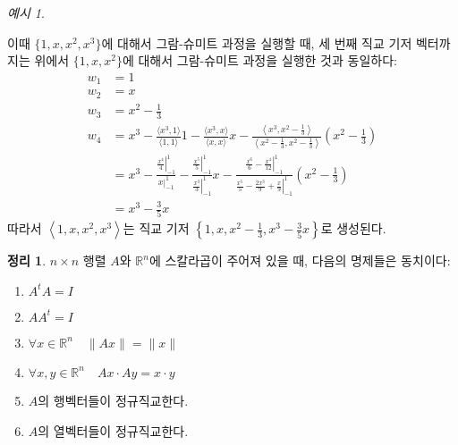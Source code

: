 \documentclass[unfonts,oneside,a4paper]{oblivoir}
\theoremstyle{definition}
\theoremstyle{theorem}
\newtheorem{theorem}[definition]{정리}
\theoremstyle{theorem}
\theoremstyle{remark}
\theoremstyle{remark}
\theoremstyle{remark}
\newtheorem*{example}{예시}
\theoremstyle{remark}
\renewcommand{\vec}[1]{\bm{\mathit{#1}}}
\begin{document}
\begin{example}
\begin{enumerate}
            이때 $\{1, x, x^2, x^3\}$에 대해서 그람-슈미트 과정을 실행할 때, 세 번째 직교 기저 벡터까지는 위에서 $\{1, x, x^2\}$에 대해서 그람-슈미트 과정을 실행한 것과 동일하다:
            \begin{align*}
                \vec w_1 &= 1\\
                \vec w_2 &= x\\
                \vec w_3 &= x^2 - \frac13\\
                \vec w_4 &= x^3 - \frac{\langle x^3, 1 \rangle}{\langle 1, 1\rangle} 1 - \frac{\langle x^3, x\rangle}{\langle x, x \rangle} x - \frac{\left\langle x^3, x^2 - \frac13\right\rangle}{\left\langle x^2 - \frac13, x^2 - \frac13 \right\rangle} \left(x^2 - \frac13\right)\\
                         &= x^3 - \frac{\left.\frac{x^4}{4}\right|_{-1}^1}{\left. x \right|_{-1}^1} - \frac{\left. \frac{x^5}{5} \right|_{-1}^1}{\left. \frac{x^3}{3} \right|_{-1}^1} x - \frac{\left. \frac{x^6}{6} - \frac{x^4}{12} \right|_{-1}^1}{\left. \frac{x^5}{5} - \frac{2x^3}{9} + \frac x9 \right|_{-1}^1}\left(x^2 - \frac13\right)\\
                         &= x^3 - \frac{3}{5}x
            \end{align*}
            따라서 $\left< 1, x, x^2, x^3 \right>$는 직교 기저 $\left\{1, x, x^2 - \frac13, x^3 - \frac{3}{5}x\right\}$로 생성된다.
    \end{enumerate}
\end{example}

\begin{theorem} \label{thm:orthogonal_mat}
    $n \times n$ 행렬 $A$와 $\mathbb R^n$에 스칼라곱이 주어져 있을 때, 다음의 명제들은 동치이다:
    \begin{enumerate}
        \item $A^t A = I$
        \item $A A^t = I$
        \item $\forall \vec x \in \mathbb R^n \quad \lVert A \vec x \rVert = \lVert \vec x \rVert$
        \item $\forall \vec x, \vec y \in \mathbb R^n \quad A \vec x \cdot A \vec y = \vec x \cdot \vec y$
        \item $A$의 행벡터들이 정규직교한다.
        \item $A$의 열벡터들이 정규직교한다.
    \end{enumerate}
\end{theorem}
\end{document}
